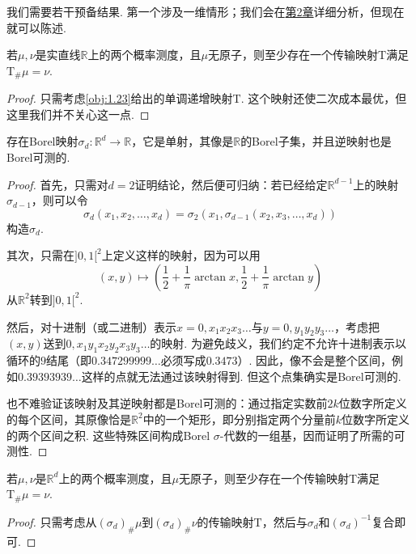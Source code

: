 我们需要若干预备结果. 第一个涉及一维情形；我们会在\hyperref[sec:2]{第2章}详细分析，但现在就可以陈述.

\begin{lemma}\label{obj:1.27}
若$\mu,\nu$是实直线$\mathbb R$上的两个概率测度，且$\mu$无原子，则至少存在一个传输映射$\mathrm{T}$满足$\mathrm{T}_\#\mu=\nu$.
\end{lemma}
\begin{proof}
只需考虑\autoref{obj:1.23}给出的单调递增映射$\mathrm{T}$. 这个映射还使二次成本最优，但这里我们并不关心这一点.
\end{proof}

\begin{lemma}\label{obj:1.28}
存在Borel映射$\sigma_d:\mathbb R^d\to\mathbb R$，它是单射，其像是$\mathbb R$的Borel子集，并且逆映射也是Borel可测的.
\end{lemma}
\begin{proof}
首先，只需对$d=2$证明结论，然后便可归纳：若已经给定$\mathbb R^{d-1}$上的映射$\sigma_{d-1}$，则可以令
\[
\sigma_d(x_1,x_2,\ldots,x_d)
=\sigma_2(x_1,\sigma_{d-1}(x_2,x_3,\ldots,x_d))
\]
构造$\sigma_d$.

其次，只需在$]0,1[^2$上定义这样的映射，因为可以用
\[
(x,y)\longmapsto
\left(\frac12+\frac1\pi\arctan x,\frac12+\frac1\pi\arctan y\right)
\]
从$\mathbb R^2$转到$]0,1[^2$.

然后，对十进制（或二进制）表示$x=0,x_1x_2x_3\ldots$与$y=0,y_1y_2y_3\ldots$，考虑把$(x,y)$送到$0,x_1y_1x_2y_2x_3y_3\ldots$的映射. 为避免歧义，我们约定不允许十进制表示以循环的$9$结尾（即$0.347299999\ldots$必须写成$0.3473$）. 因此，像不会是整个区间，例如$0.39393939\ldots$这样的点就无法通过该映射得到. 但这个点集确实是Borel可测的.

也不难验证该映射及其逆映射都是Borel可测的：通过指定实数前$2k$位数字所定义的每个区间，其原像恰是$\mathbb R^2$中的一个矩形，即分别指定两个分量前$k$位数字所定义的两个区间之积. 这些特殊区间构成Borel $\sigma$-代数的一组基，因而证明了所需的可测性.
\end{proof}

\begin{corollary}\label{obj:1.29}
若$\mu,\nu$是$\mathbb R^d$上的两个概率测度，且$\mu$无原子，则至少存在一个传输映射$\mathrm{T}$满足$\mathrm{T}_\#\mu=\nu$.
\end{corollary}
\begin{proof}
只需考虑从$(\sigma_d)_\#\mu$到$(\sigma_d)_\#\nu$的传输映射$\mathrm{T}$，然后与$\sigma_d$和$(\sigma_d)^{-1}$复合即可.
\end{proof}

